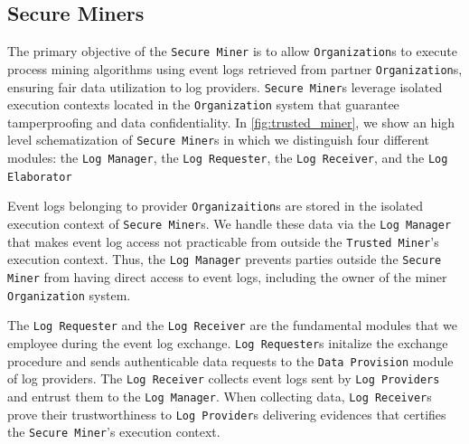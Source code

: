 \subsection{Secure Miners}
The primary objective of the \texttt{Secure Miner} is to allow \texttt{Organization}s to execute process mining algorithms using %
event logs retrieved from partner \texttt{Organization}s, ensuring fair data utilization to log providers. \texttt{Secure Miner}s leverage isolated execution contexts located in the \texttt{Organization} system that guarantee tamperproofing and data confidentiality. In \cref{fig:trusted_miner}, we show an high level schematization of \texttt{Secure Miner}s in which we distinguish four different modules: the \texttt{Log Manager}, the \texttt{Log Requester}, the \texttt{Log Receiver}, and the \texttt{Log Elaborator}

Event logs belonging to provider \texttt{Organizaition}s are stored in the isolated execution context of \texttt{Secure Miner}s. We handle these data via the \texttt{Log Manager} that makes event log access not practicable from outside the \texttt{Trusted Miner}'s execution context. Thus, the \texttt{Log Manager} prevents parties outside the \texttt{Secure Miner} from having direct access to event logs, including the owner of the miner \texttt{Organization} system. %

The \texttt{Log Requester} and the \texttt{Log Receiver} are the fundamental modules that we employee during the event log exchange. \texttt{Log Requester}s initalize the exchange procedure and sends authenticable data requests to the \texttt{Data Provision} module of log providers. The \texttt{Log Receiver} collects event logs sent by \texttt{Log Providers} and entrust them to the \texttt{Log Manager}. When collecting data, \texttt{Log Receiver}s prove their trustworthiness to \texttt{Log Provider}s delivering evidences that certifies the \texttt{Secure Miner}'s execution context.%

